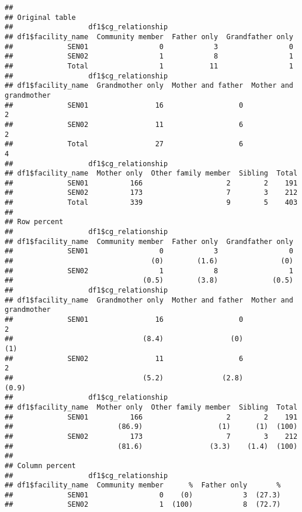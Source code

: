 \documentclass[
]{article}
\begin{document}
\begin{verbatim}
## 
## Original table 
##                  df1$cg_relationship
## df1$facility_name  Community member  Father only  Grandfather only
##             SEN01                 0            3                 0
##             SEN02                 1            8                 1
##             Total                 1           11                 1
##                  df1$cg_relationship
## df1$facility_name  Grandmother only  Mother and father  Mother and grandmother
##             SEN01                16                  0                       2
##             SEN02                11                  6                       2
##             Total                27                  6                       4
##                  df1$cg_relationship
## df1$facility_name  Mother only  Other family member  Sibling  Total
##             SEN01          166                    2        2    191
##             SEN02          173                    7        3    212
##             Total          339                    9        5    403
## 
## Row percent 
##                  df1$cg_relationship
## df1$facility_name  Community member  Father only  Grandfather only
##             SEN01                 0            3                 0
##                                 (0)        (1.6)               (0)
##             SEN02                 1            8                 1
##                               (0.5)        (3.8)             (0.5)
##                  df1$cg_relationship
## df1$facility_name  Grandmother only  Mother and father  Mother and grandmother
##             SEN01                16                  0                       2
##                               (8.4)                (0)                     (1)
##             SEN02                11                  6                       2
##                               (5.2)              (2.8)                   (0.9)
##                  df1$cg_relationship
## df1$facility_name  Mother only  Other family member  Sibling  Total
##             SEN01          166                    2        2    191
##                         (86.9)                  (1)      (1)  (100)
##             SEN02          173                    7        3    212
##                         (81.6)                (3.3)    (1.4)  (100)
## 
## Column percent 
##                  df1$cg_relationship
## df1$facility_name  Community member      %  Father only       %
##             SEN01                 0    (0)            3  (27.3)
##             SEN02                 1  (100)            8  (72.7)

\end{verbatim}
\end{document}
